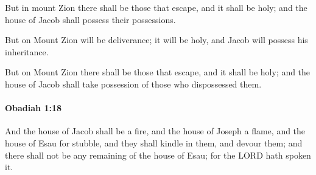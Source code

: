 			\begin{versebox}
					\item[BHS] 
					\item[LXX] 
					\item[ASV] But in mount Zion there shall be those that escape, and it shall be holy; and the house of Jacob shall possess their possessions.
					\item[NIV] But on Mount Zion will be deliverance; it will be holy, and Jacob will possess his inheritance.
					\item[NRSV] But on Mount Zion there shall be those that escape, and it shall be holy; and the house of Jacob shall take possession of those who dispossessed them.
			\end{versebox}

		\paragraph{Obadiah 1:18} %
			\label{OBADIAH-1-18}

			And the house of Jacob shall be a fire, and the house of Joseph a flame, and the house of Esau for stubble, and they shall kindle in them, and devour them; and there shall not be any remaining of the house of Esau; for the LORD hath spoken it.

